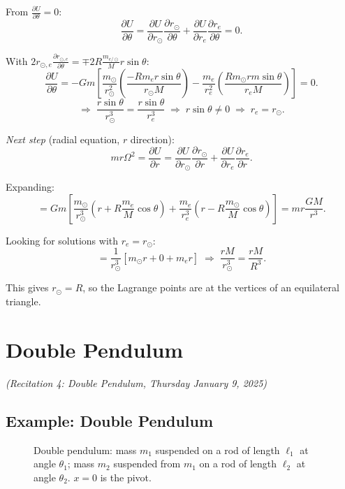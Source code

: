 From $\frac{\partial U}{\partial\theta} = 0$:
\[
    \frac{\partial U}{\partial\theta}
    = \frac{\partial U}{\partial r_\odot}\frac{\partial r_\odot}{\partial\theta}
    + \frac{\partial U}{\partial r_e}\frac{\partial r_e}{\partial\theta} = 0.
\]

With $2r_{\odot,e}\frac{\partial r_{\odot,e}}{\partial\theta} = \mp 2R\frac{m_{e/\odot}}{M}r\sin\theta$:
\[
    \frac{\partial U}{\partial\theta}
    = -Gm\left[\frac{m_\odot}{r_\odot^2}\!\left(\frac{-Rm_e r\sin\theta}{r_\odot M}\right)
    - \frac{m_e}{r_e^2}\!\left(\frac{Rm_\odot r m\sin\theta}{r_e M}\right)\right] = 0.
\]
\[
    \Rightarrow\; \frac{r\sin\theta}{r_\odot^3} = \frac{r\sin\theta}{r_e^3}
    \;\Rightarrow\; r\sin\theta \neq 0
    \;\Rightarrow\; r_e = r_\odot.
\]

\textit{Next step} (radial equation, $r$ direction):
\[
    mr\Omega^2 = \frac{\partial U}{\partial r}
    = \frac{\partial U}{\partial r_\odot}\frac{\partial r_\odot}{\partial r}
    + \frac{\partial U}{\partial r_e}\frac{\partial r_e}{\partial r}.
\]

Expanding:
\[
    = Gm\left[\frac{m_\odot}{r_\odot^3}\!\left(r + R\frac{m_e}{M}\cos\theta\right)
    + \frac{m_e}{r_e^3}\!\left(r - R\frac{m_\odot}{M}\cos\theta\right)\right]
    = mr\frac{GM}{r^3}.
\]

Looking for solutions with $r_e = r_\odot$:
\[
    = \frac{1}{r_\odot^3}\left[m_\odot r + 0 + m_e r\right]
    \;\Rightarrow\; \frac{rM}{r_\odot^3} = \frac{rM}{R^3}.
\]

This gives $r_\odot = R$, so the Lagrange points are at the vertices of an
equilateral triangle.

\chapter{Double Pendulum}

\textit{(Recitation 4: Double Pendulum, Thursday January 9, 2025)}

\section{Example: Double Pendulum}

\begin{figure}[H]
    \centering
    \caption{Double pendulum: mass $m_1$ suspended on a rod of length $\ell_1$
    at angle $\theta_1$; mass $m_2$ suspended from $m_1$ on a rod of length
    $\ell_2$ at angle $\theta_2$.  $x = 0$ is the pivot.}
\end{figure}

